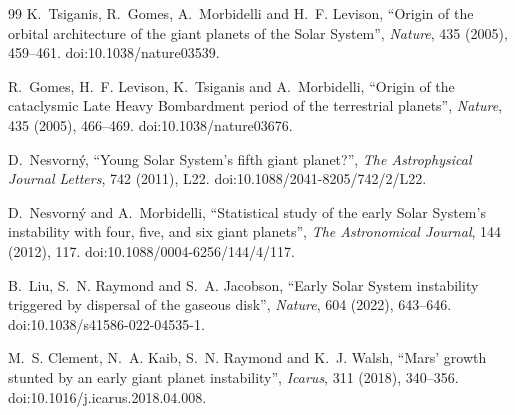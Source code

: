 \documentclass[11pt,a4paper,openany]{report}
\begin{document}
\begin{thebibliography}{99}
 K.~Tsiganis, R.~Gomes, A.~Morbidelli and H.~F. Levison, ``Origin of the
orbital architecture of the giant planets of the Solar System'', \emph{Nature}, 435 (2005),
459--461. doi:10.1038/nature03539.

 R.~Gomes, H.~F. Levison, K.~Tsiganis and A.~Morbidelli, ``Origin of the
cataclysmic Late Heavy Bombardment period of the terrestrial planets'', \emph{Nature}, 435
(2005), 466--469. doi:10.1038/nature03676.

 D.~Nesvorn\'y, ``Young Solar System's fifth giant planet?'',
\emph{The Astrophysical Journal Letters}, 742 (2011), L22. doi:10.1088/2041-8205/742/2/L22.

 D.~Nesvorn\'y and A.~Morbidelli, ``Statistical study of the early
Solar System's instability with four, five, and six giant planets'', \emph{The Astronomical
Journal}, 144 (2012), 117. doi:10.1088/0004-6256/144/4/117.

 B.~Liu, S.~N. Raymond and S.~A. Jacobson, ``Early Solar System instability
triggered by dispersal of the gaseous disk'', \emph{Nature}, 604 (2022), 643--646.
doi:10.1038/s41586-022-04535-1.

 M.~S. Clement, N.~A. Kaib, S.~N. Raymond and K.~J. Walsh, ``Mars' growth
stunted by an early giant planet instability'', \emph{Icarus}, 311 (2018), 340--356.
doi:10.1016/j.icarus.2018.04.008.

\end{thebibliography}
\end{document}
